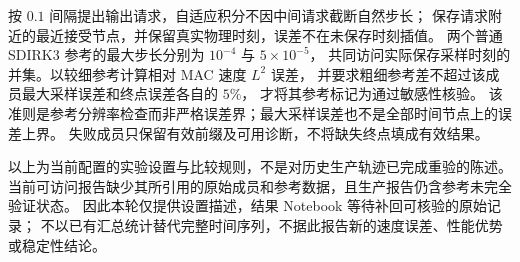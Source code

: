 按 $0.1$ 间隔提出输出请求，自适应积分不因中间请求截断自然步长；
保存请求附近的最近接受节点，并保留真实物理时刻，误差不在未保存时刻插值。
两个普通 SDIRK3 参考的最大步长分别为 $10^{-4}$ 与 $5\times10^{-5}$，
共同访问实际保存采样时刻的并集。以较细参考计算相对 MAC 速度 $L^2$ 误差，
并要求粗细参考差不超过该成员最大采样误差和终点误差各自的 $5\%$，
才将其参考标记为通过敏感性核验。
该准则是参考分辨率检查而非严格误差界；最大采样误差也不是全部时间节点上的误差上界。
失败成员只保留有效前缀及可用诊断，不将缺失终点填成有效结果。

以上为当前配置的实验设置与比较规则，不是对历史生产轨迹已完成重验的陈述。
当前可访问报告缺少其所引用的原始成员和参考数据，且生产报告仍含参考未完全验证状态。
因此本轮仅提供设置描述，结果 Notebook 等待补回可核验的原始记录；
不以已有汇总统计替代完整时间序列，不据此报告新的速度误差、性能优势或稳定性结论。
